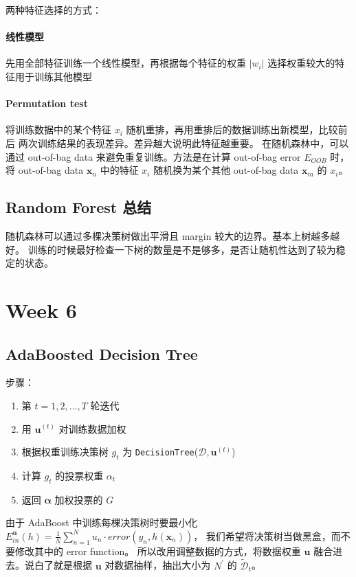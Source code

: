 \documentclass[a4paper]{article}
\begin{document}
两种特征选择的方式：
\paragraph{线性模型}
先用全部特征训练一个线性模型，再根据每个特征的权重 $|w_i|$ 选择权重较大的特征用于训练其他模型

\paragraph{Permutation test}
将训练数据中的某个特征 $x_i$ 随机重排，再用重排后的数据训练出新模型，比较前后
两次训练结果的表现差异。差异越大说明此特征越重要。
在随机森林中，可以通过 out-of-bag data 来避免重复训练。方法是在计算 out-of-bag error $E_{OOB}$ 时，
将 out-of-bag data $\mathbf{x}_n$ 中的特征 $x_i$ 随机换为某个其他 out-of-bag data $\mathbf{x}_m$ 的 $x_i$。

\subsection{Random Forest 总结}
随机森林可以通过多棵决策树做出平滑且 margin 较大的边界。基本上树越多越好。
训练的时候最好检查一下树的数量是不是够多，是否让随机性达到了较为稳定的状态。


\section{Week 6}
\subsection{AdaBoosted Decision Tree}
步骤：
\begin{enumerate}
  \item 第 $t=1,2,\dots,T$ 轮迭代 \\
  \item 用 $\mathbf{u}^{(t)}$ 对训练数据加权 \\
  \item 根据权重训练决策树 $g_t$ 为 \texttt{DecisionTree}($\mathcal{D}, \mathbf{u}^{(t)}$) \\
  \item 计算 $g_t$ 的投票权重 $\alpha_t$
  \item 返回 $\mathbf{\alpha}$ 加权投票的 $G$
\end{enumerate}

由于 AdaBoost 中训练每棵决策树时要最小化 $\displaystyle E_{in}^{\mathbf{u}}(h) = \frac{1}{N}\sum_{n=1}^{N}u_n \cdot error(y_n, h(\mathbf{x}_n))$，
我们希望将决策树当做黑盒，而不要修改其中的 error function。
所以改用调整数据的方式，将数据权重 $\mathbf{u}$ 融合进去。说白了就是根据
$\mathbf{u}$ 对数据抽样，抽出大小为 $N^{\prime}$ 的 $\tilde{\mathcal{D}}_t$。
\end{document}
